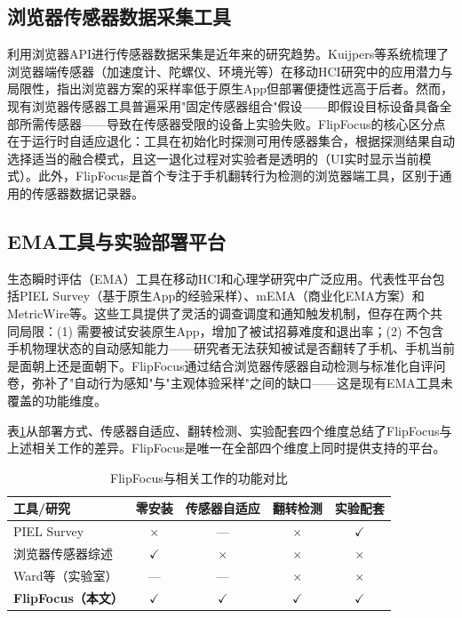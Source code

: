 \documentclass[12pt,a4paper]{ctexart}
\begin{document}
\subsection{浏览器传感器数据采集工具}

利用浏览器API进行传感器数据采集是近年来的研究趋势。Kuijpers等\cite{kuijpers2022browser}系统梳理了浏览器端传感器（加速度计、陀螺仪、环境光等）在移动HCI研究中的应用潜力与局限性，指出浏览器方案的采样率低于原生App但部署便捷性远高于后者。然而，现有浏览器传感器工具普遍采用"固定传感器组合"假设——即假设目标设备具备全部所需传感器——导致在传感器受限的设备上实验失败。FlipFocus的核心区分点在于运行时自适应退化：工具在初始化时探测可用传感器集合，根据探测结果自动选择适当的融合模式，且这一退化过程对实验者是透明的（UI实时显示当前模式）。此外，FlipFocus是首个专注于手机翻转行为检测的浏览器端工具，区别于通用的传感器数据记录器。

\subsection{EMA工具与实验部署平台}

生态瞬时评估（EMA）工具在移动HCI和心理学研究中广泛应用。代表性平台包括PIEL Survey\cite{piel2015}（基于原生App的经验采样）、mEMA（商业化EMA方案）和MetricWire等。这些工具提供了灵活的调查调度和通知触发机制，但存在两个共同局限：(1) 需要被试安装原生App，增加了被试招募难度和退出率；(2) 不包含手机物理状态的自动感知能力——研究者无法获知被试是否翻转了手机、手机当前是面朝上还是面朝下。FlipFocus通过结合浏览器传感器自动检测与标准化自评问卷，弥补了"自动行为感知"与"主观体验采样"之间的缺口——这是现有EMA工具未覆盖的功能维度。

表\ref{tab:related_work}从部署方式、传感器自适应、翻转检测、实验配套四个维度总结了FlipFocus与上述相关工作的差异。FlipFocus是唯一在全部四个维度上同时提供支持的平台。

\begin{table}[H]
\centering
\caption{FlipFocus与相关工作的功能对比}
\label{tab:related_work}
\begin{tabular}{@{}p{2.5cm}cccc@{}}
\toprule
\textbf{工具/研究} & \textbf{零安装} & \textbf{传感器自适应} & \textbf{翻转检测} & \textbf{实验配套} \\
\midrule
PIEL Survey\cite{piel2015} & $\times$ & --- & $\times$ & $\checkmark$ \\
浏览器传感器综述\cite{kuijpers2022browser} & $\checkmark$ & $\times$ & $\times$ & $\times$ \\
Ward等\cite{ward2017brain}（实验室） & --- & --- & $\times$ & $\times$ \\
\textbf{FlipFocus（本文）} & $\checkmark$ & $\checkmark$ & $\checkmark$ & $\checkmark$ \\
\bottomrule
\end{tabular}
\end{table}
\end{document}
